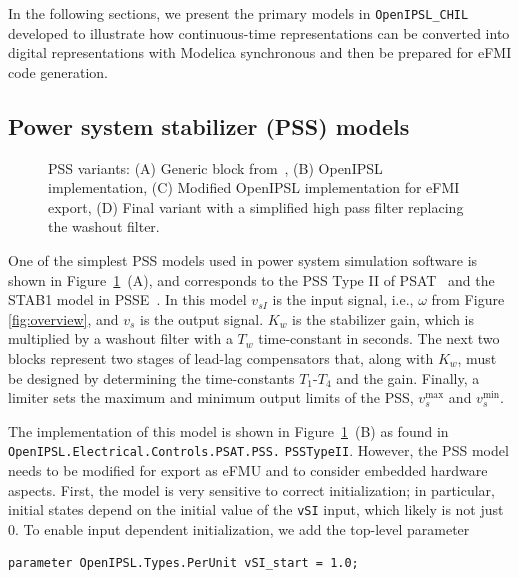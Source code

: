 \noindent{}In the following sections, we present the primary models in \texttt{OpenIPSL\_CHIL} developed to illustrate how continuous-time representations can be converted into digital representations with Modelica synchronous and then be prepared for eFMI code generation.

\subsection{Power system stabilizer (PSS) models}\label{sec:pss-models}

\begin{figure}[t!]
    \centerline{}
    \vspace{-2ex}
    \caption{PSS variants: (A) Generic block from~\cite{psat}, (B) OpenIPSL implementation, (C) Modified OpenIPSL implementation for eFMI export, (D) Final variant with a simplified high pass filter replacing the washout filter.}
    \label{fig:pssvariants}
    \vspace{-2ex}
\end{figure}

One of the simplest PSS models used in power system simulation software is shown in Figure~\ref{fig:pssvariants}~(A), and corresponds to the PSS Type II of PSAT~\cite{psat} and the STAB1 model in PSS\regtm{}E~\cite{psse}. In this model $v_{sI}$ is the input signal, i.e., $\omega$ from Figure \ref{fig:overview}, and $v_s$ is the output signal. $K_w$ is the stabilizer gain, which is multiplied by a washout filter with a $T_w$ time-constant in seconds. The next two blocks represent two stages of lead-lag compensators that, along with $K_w$, must be designed by determining the time-constants $T_1$-$T_4$ and the gain. Finally, a limiter sets the maximum and minimum output limits of the PSS, $v_s^{\mathrm{max}}$ and $v_s^{\mathrm{min}}$.

The implementation of this \controller{} model is shown in Figure~\ref{fig:pssvariants}~(B) as found in \texttt{OpenIPSL.Electrical.Controls.PSAT.PSS.} \texttt{PSSTypeII}. However, the PSS model needs to be modified for export as eFMU and to consider embedded hardware aspects. First, the model is very sensitive to correct initialization; in particular, initial states depend on the initial value of the \texttt{vSI} input, which likely is not just 0. To enable input dependent initialization, we add the top-level parameter

\begin{lstlisting}[language = modelica, numbers = none]
parameter OpenIPSL.Types.PerUnit vSI_start = 1.0;
\end{lstlisting}

